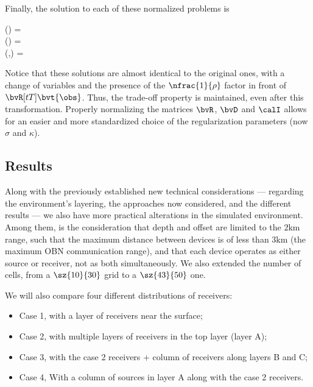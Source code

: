 Finally, the solution to each of these normalized problems is
\begin{subgather}
	(\sigma) =  \inv*{\bvR[tT] \bvR[t] + \sigma^2 \bvD[tT] \bvD[t]} \bvR[tT] \bvt{\obs} \\
	(\sigma) =   \\
	(\sigma,\kappa) = \inv*{\bvR[tT] \bvR[t] + \sigma^2 \bvD[tT] \bvD[t] + \kappa^2 \calI[tT] \calI[t]} 
\end{subgather}

Notice that these solutions are almost identical to the original ones, with a change of variables and the presence of the $\nfrac{1}{\rho}$ factor in front of $\bvR[tT] \bvt{\obs}$. Thus, the trade-off property is maintained, even after this transformation. Properly normalizing the matrices $\bvR$, $\bvD$ and $\calI$ allows for an easier and more standardized choice of the regularization parameters (now $\sigma$ and $\kappa$).

\subsection{Results}


Along with the previously established new technical considerations --- regarding the environment's layering, the approaches now considered, and the different results --- we also have more practical alterations in the simulated environment. Among them, is the consideration that depth and offset are limited to the $2\si{\kilo\meter}$ range, such that the maximum distance between devices is of less than $3\si{\kilo\meter}$ (the maximum OBN communication range), and that each device operates as either source or receiver, not as both simultaneously. We also extended the number of cells, from a $\sz{10}{30}$ grid to a $\sz{43}{50}$ one.

We will also compare four different distributions of receivers:
\begin{itemize}
	\item Case 1, with a layer of receivers near the surface;
	\item Case 2, with multiple layers of receivers in the top layer (layer A);
	\item Case 3, with the case 2 receivers + column of receivers along layers B and C;
	\item Case 4, With a column of sources in layer A along with the case 2 receivers.
\end{itemize}

